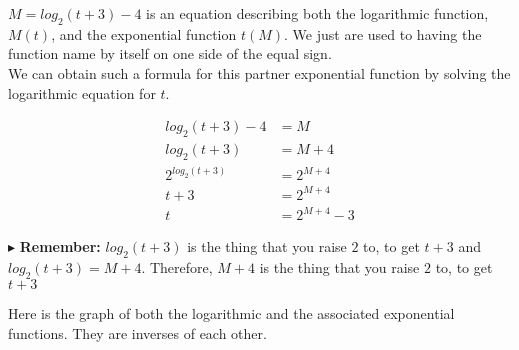 \documentclass{ximera}
\begin{document}
$M = log_2(t+3) - 4$ is an equation describing both the logarithmic function, $M(t)$, and the exponential function $t(M)$.  We just are used to having the function name by itself on one side of the equal sign. \\


We can obtain such a formula for this partner exponential function by solving the logarithmic equation for $t$.





\begin{align*}
log_2(t+3) - 4 & = M \\
log_2(t+3) & = M + 4 \\
2^{log_2(t+3)} & = 2^{M+4} \\
t+3 & = 2^{M+4} \\
t & = 2^{M+4} - 3
\end{align*}


$\blacktriangleright$ \textbf{Remember:} $log_2(t+3)$ is the thing that you raise $2$ to, to get $t+3$ and $log_2(t+3) = M+4$.  Therefore, $M+4$ is the thing that you raise $2$ to, to get $t+3$





Here is the graph of both the logarithmic and the associated exponential functions. They are inverses of each other.
\end{document}
